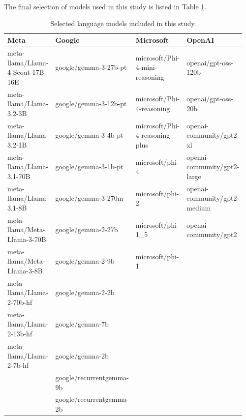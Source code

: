 The final selection of models used in this study is listed in Table \ref{tab:selected_models}.

\begin{table}[H]
    \begin{tabular}{p{0.24\linewidth} p{0.24\linewidth} p{0.24\linewidth} p{0.24\linewidth}}
        \hline
        Meta & Google & Microsoft & OpenAI \\
        \hline
        meta-llama/Llama-4-Scout-17B-16E & google/gemma-3-27b-pt & microsoft/Phi-4-mini-reasoning & openai/gpt-oss-120b \\
        meta-llama/Llama-3.2-3B & google/gemma-3-12b-pt & microsoft/Phi-4-reasoning & openai/gpt-oss-20b \\
        meta-llama/Llama-3.2-1B & google/gemma-3-4b-pt & microsoft/Phi-4-reasoning-plus & openai-community/gpt2-xl \\
        meta-llama/Llama-3.1-70B & google/gemma-3-1b-pt & microsoft/phi-4 & openai-community/gpt2-large \\
        meta-llama/Llama-3.1-8B & google/gemma-3-270m & microsoft/phi-2 & openai-community/gpt2-medium \\
        meta-llama/Meta-Llama-3-70B & google/gemma-2-27b & microsoft/phi-1\_5 & openai-community/gpt2 \\
        meta-llama/Meta-Llama-3-8B & google/gemma-2-9b & microsoft/phi-1 & \\
        meta-llama/Llama-2-70b-hf & google/gemma-2-2b &  & \\
        meta-llama/Llama-2-13b-hf & google/gemma-7b &  & \\
        meta-llama/Llama-2-7b-hf & google/gemma-2b &  & \\
            & google/recurrentgemma-9b &  & \\
            & google/recurrentgemma-2b &  & \\
        \hline
    \end{tabular}
    \caption{Selected language models included in this study.}
    \label{tab:selected_models}
\end{table}

